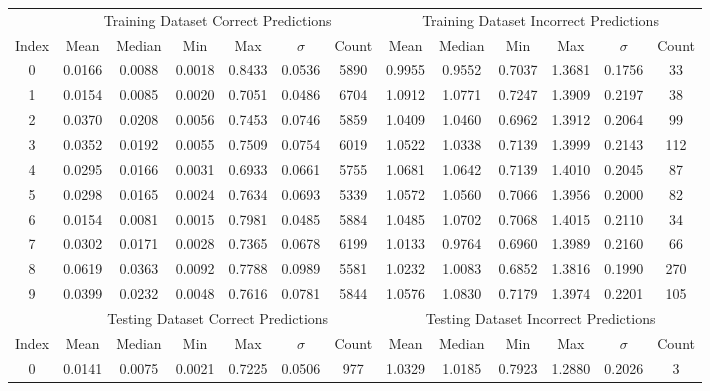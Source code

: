 
\begin{table}[h]
\centering
\scriptsize
\begin{tabular}{c|cccccc|cccccc}
\hline
 & \multicolumn{6}{c|}{Training Dataset Correct Predictions} & \multicolumn{6}{c}{Training Dataset Incorrect Predictions} \\
Index & Mean & Median & Min & Max & $\sigma$ & Count & Mean & Median & Min & Max & $\sigma$ & Count \\ \hline
0 & 0.0166 & 0.0088 & 0.0018 & 0.8433 & 0.0536 & 5890 & 0.9955 & 0.9552 & 0.7037 & 1.3681 & 0.1756 & 33 \\
1 & 0.0154 & 0.0085 & 0.0020 & 0.7051 & 0.0486 & 6704 & 1.0912 & 1.0771 & 0.7247 & 1.3909 & 0.2197 & 38 \\
2 & 0.0370 & 0.0208 & 0.0056 & 0.7453 & 0.0746 & 5859 & 1.0409 & 1.0460 & 0.6962 & 1.3912 & 0.2064 & 99 \\
3 & 0.0352 & 0.0192 & 0.0055 & 0.7509 & 0.0754 & 6019 & 1.0522 & 1.0338 & 0.7139 & 1.3999 & 0.2143 & 112 \\
4 & 0.0295 & 0.0166 & 0.0031 & 0.6933 & 0.0661 & 5755 & 1.0681 & 1.0642 & 0.7139 & 1.4010 & 0.2045 & 87 \\
5 & 0.0298 & 0.0165 & 0.0024 & 0.7634 & 0.0693 & 5339 & 1.0572 & 1.0560 & 0.7066 & 1.3956 & 0.2000 & 82 \\
6 & 0.0154 & 0.0081 & 0.0015 & 0.7981 & 0.0485 & 5884 & 1.0485 & 1.0702 & 0.7068 & 1.4015 & 0.2110 & 34 \\
7 & 0.0302 & 0.0171 & 0.0028 & 0.7365 & 0.0678 & 6199 & 1.0133 & 0.9764 & 0.6960 & 1.3989 & 0.2160 & 66 \\
8 & 0.0619 & 0.0363 & 0.0092 & 0.7788 & 0.0989 & 5581 & 1.0232 & 1.0083 & 0.6852 & 1.3816 & 0.1990 & 270 \\
9 & 0.0399 & 0.0232 & 0.0048 & 0.7616 & 0.0781 & 5844 & 1.0576 & 1.0830 & 0.7179 & 1.3974 & 0.2201 & 105 \\ \hline
 & \multicolumn{6}{c|}{Testing Dataset Correct Predictions} & \multicolumn{6}{c}{Testing Dataset Incorrect Predictions} \\
Index & Mean & Median & Min & Max & $\sigma$ & Count & Mean & Median & Min & Max & $\sigma$ & Count \\ \hline
0 & 0.0141 & 0.0075 & 0.0021 & 0.7225 & 0.0506 & 977 & 1.0329 & 1.0185 & 0.7923 & 1.2880 & 0.2026 & 3 \\

\end{tabular}
\end{table}
